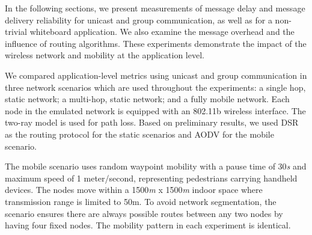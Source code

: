 \documentclass[lnicst]{svmultln}
\begin{document}
In the following sections, we present measurements of message delay and message delivery reliability for unicast and group communication, as well as for a non-trivial whiteboard application. We also examine the message overhead and the influence of routing algorithms. These experiments demonstrate the impact of the wireless network and mobility at the application level.

We compared application-level metrics using unicast and group communication in three network scenarios which are used throughout the experiments: a single hop, static network; a multi-hop, static network; and a fully mobile network. Each node in the emulated network is equipped with an 802.11b wireless interface. The two-ray model is used for path loss. Based on preliminary results, we used DSR\cite{dsr} as the routing protocol for the static scenarios and AODV\cite{aodv} for the mobile scenario.


The mobile scenario uses random waypoint mobility with a pause time of 30\textit{s} and maximum speed of 1 meter/second, representing pedestrians carrying handheld devices. The nodes move within a 1500\textit{m} x 1500\textit{m} indoor space where transmission range is limited to 50m. To avoid network segmentation, the scenario ensures there are always possible routes between any two nodes by having four fixed nodes. The mobility pattern in each experiment is identical.


\end{document}
